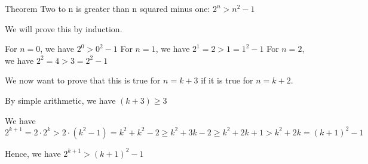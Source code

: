 
Theorem Two to n is greater than n squared minus one: $2^n > n^2 - 1$

We will prove this by induction.

For $n = 0$, we have $2^0 > 0^2 - 1$
For $n = 1$, we have $2^1 = 2 > 1 = 1^2 - 1$
For $n = 2$, we have $2^2 = 4 > 3 = 2^2 - 1$

We now want to prove that this is true for $n = k + 3$ if it is true for $n = k + 2$.

By simple arithmetic, we have $(k+3) \geq 3$

We have $2^{k+1} = 2 \cdot 2^k > 2 \cdot (k^2 - 1) = k^2 + k^2 - 2 \geq k^2 + 3k - 2 \geq k^2 + 2k + 1 \gt k^2 + 2k = (k+1)^2 - 1$ 

Hence, we have $2^{k+1} > (k+1)^2 - 1$